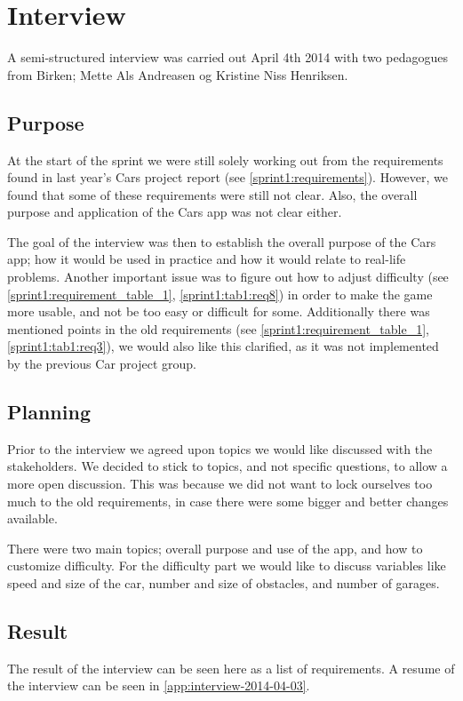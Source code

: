 \section{Interview}\label{s2interview}
A semi-structured interview \cite{deb} was carried out April 4th 2014 with two pedagogues from Birken; Mette Als Andreasen og Kristine Niss Henriksen.

\subsection{Purpose}
At the start of the sprint we were still solely working out from the requirements found in last year's Cars project report (see \cref{sprint1:requirements}).
However, we found that some of these requirements were still not clear.
Also, the overall purpose and application of the Cars app was not clear either.

The goal of the interview was then to establish the overall purpose of the Cars app; how it would be used in practice and how it would relate to real-life problems.
Another important issue was to figure out how to adjust difficulty (see \cref{sprint1:requirement_table_1}, \cref{sprint1:tab1:req8}) in order to make the game more usable, and not be too easy or difficult for some.
Additionally there was mentioned points in the old requirements (see \cref{sprint1:requirement_table_1}, \cref{sprint1:tab1:req3}), we would also like this clarified, as it was not implemented by the previous Car project group.

\subsection{Planning}
Prior to the interview we agreed upon topics we would like discussed with the stakeholders.
We decided to stick to topics, and not specific questions, to allow a more open discussion.
This was because we did not want to lock ourselves too much to the old requirements, in case there were some bigger and better changes available.

There were two main topics; overall purpose and use of the app, and how to customize difficulty.
For the difficulty part we would like to discuss variables like speed and size of the car, number and size of obstacles, and number of garages.

\subsection{Result}
The result of the interview can be seen here as a list of requirements.
A resume of the interview can be seen in \cref{app:interview-2014-04-03}.

